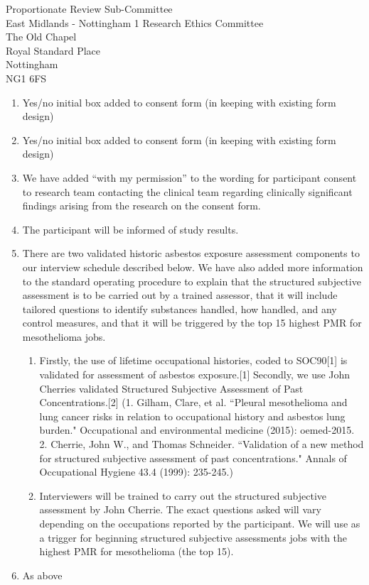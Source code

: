 \documentclass[imperial,letterpaper,pagesize,UScommercial9]{scrlttr2}
\begin{document}
\begin{letter}{    
    Proportionate Review Sub-Committee \\        
    East Midlands - Nottingham 1 Research Ethics Committee \\
    The Old Chapel \\
    Royal Standard Place \\
    Nottingham \\
    NG1 6FS}
\begin{enumerate}[]
\begin{enumerate}[label=(\alph*)]
            \item Patient Liaison and Advisory Services (PALS) contact details are included.
        \end{enumerate}
        \item Yes/no initial box added to consent form (in keeping with existing form design)
        \item Yes/no initial box added to consent form (in keeping with existing form design)
        \item We have added ``with my permission'' to the wording for participant consent to research team contacting the clinical team regarding clinically significant findings arising from the research on the consent form.
        \item The participant will be informed of study results.
        \item There are two validated historic asbestos exposure assessment components to our interview schedule described below. We have also added more information to the standard operating procedure to explain that the structured subjective assessment is to be carried out by a trained assessor, that it will include tailored questions to identify substances handled, how handled, and any control measures, and that it will be triggered by the top 15 highest PMR for mesothelioma jobs.
            \begin{enumerate}
                \item Firstly, the use of lifetime occupational histories, coded to SOC90[1] is validated for assessment of asbestos exposure.[1] Secondly, we use John Cherries validated Structured Subjective Assessment of Past Concentrations.[2] (1. Gilham, Clare, et al. ``Pleural mesothelioma and lung cancer risks in relation to occupational history and asbestos lung burden." Occupational and environmental medicine
                    (2015): oemed-2015. 2. Cherrie, John W., and Thomas Schneider. ``Validation of a new method for structured subjective assessment of past concentrations." Annals of Occupational Hygiene 43.4 (1999): 235-245.)
                \item Interviewers will be trained to carry out the structured subjective assessment by John Cherrie. The exact questions asked will vary depending on the occupations reported by the participant. We will use as a trigger for beginning structured subjective assessments jobs with the highest PMR for mesothelioma (the top 15).
            \end{enumerate}
        \item As above

\end{enumerate}
\end{letter}
\end{document}
